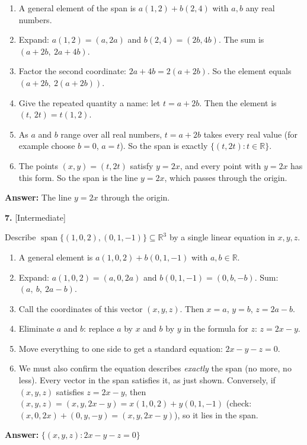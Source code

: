 \documentclass[11pt]{article}
\begin{document}
\begin{tcolorbox}[breakable,colback=ans,colframe=ansb,boxrule=0.5pt,left=4pt,right=4pt,top=2pt,bottom=2pt]\begin{enumerate}[leftmargin=2.2em,itemsep=1pt,topsep=1pt,label=\textbf{Step \arabic*.}]\item A general element of the span is $a(1,2)+b(2,4)$ with $a,b$ any real numbers.
\item Expand: $a(1,2)=(a,2a)$ and $b(2,4)=(2b,4b)$. The sum is $(a+2b,\ 2a+4b)$.
\item Factor the second coordinate: $2a+4b=2(a+2b)$. So the element equals $(a+2b,\ 2(a+2b))$.
\item Give the repeated quantity a name: let $t=a+2b$. Then the element is $(t,\,2t)=t(1,2)$.
\item As $a$ and $b$ range over all real numbers, $t=a+2b$ takes every real value (for example choose $b=0$, $a=t$). So the span is exactly $\{(t,2t):t\in\mathbb{R}\}$.
\item The points $(x,y)=(t,2t)$ satisfy $y=2x$, and every point with $y=2x$ has this form. So the span is the line $y=2x$, which passes through the origin.
\end{enumerate}\textbf{Answer:} The line $y=2x$ through the origin.\end{tcolorbox}
\par\vspace{2pt}
\begin{minipage}{\linewidth}\textbf{7.} \hfill{\scriptsize\color{ink}[Intermediate]}\par\nopagebreak Describe $\operatorname{span}\{(1,0,2),(0,1,-1)\}\subseteq\mathbb{R}^{3}$ by a single linear equation in $x,y,z$.
\end{minipage}\par\nopagebreak
\begin{tcolorbox}[breakable,colback=ans,colframe=ansb,boxrule=0.5pt,left=4pt,right=4pt,top=2pt,bottom=2pt]\begin{enumerate}[leftmargin=2.2em,itemsep=1pt,topsep=1pt,label=\textbf{Step \arabic*.}]\item A general element is $a(1,0,2)+b(0,1,-1)$ with $a,b\in\mathbb{R}$.
\item Expand: $a(1,0,2)=(a,0,2a)$ and $b(0,1,-1)=(0,b,-b)$. Sum: $(a,\ b,\ 2a-b)$.
\item Call the coordinates of this vector $(x,y,z)$. Then $x=a$, $y=b$, $z=2a-b$.
\item Eliminate $a$ and $b$: replace $a$ by $x$ and $b$ by $y$ in the formula for $z$: $z=2x-y$.
\item Move everything to one side to get a standard equation: $2x-y-z=0$.
\item We must also confirm the equation describes \emph{exactly} the span (no more, no less). Every vector in the span satisfies it, as just shown. Conversely, if $(x,y,z)$ satisfies $z=2x-y$, then $(x,y,z)=(x,y,2x-y)=x(1,0,2)+y(0,1,-1)$ (check: $(x,0,2x)+(0,y,-y)=(x,y,2x-y)$), so it lies in the span.
\end{enumerate}\textbf{Answer:} $\{(x,y,z):2x-y-z=0\}$\end{tcolorbox}
\end{document}
